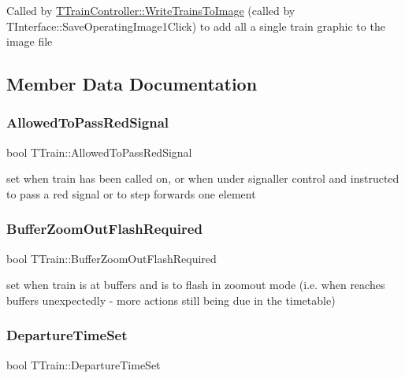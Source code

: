 Called by \mbox{\hyperlink{class_t_train_controller_aa5e441a9ec80e5076b2c05c2bb6f3fd3}{T\+Train\+Controller\+::\+Write\+Trains\+To\+Image}} (called by T\+Interface\+::\+Save\+Operating\+Image1\+Click) to add all a single train graphic to the image file 

\subsection{Member Data Documentation}
\mbox{\label{class_t_train_a8c94580b79a8ad1ad0fce51f0abba822}} 
\subsubsection{\texorpdfstring{Allowed\+To\+Pass\+Red\+Signal}{AllowedToPassRedSignal}}
{\footnotesize\ttfamily bool T\+Train\+::\+Allowed\+To\+Pass\+Red\+Signal\hspace{0.3cm}{\ttfamily [private]}}

set when train has been called on, or when under signaller control and instructed to pass a red signal or to step forwards one element \mbox{\label{class_t_train_a60a3a9bebf64411f5d200682575a69ee}} 
\subsubsection{\texorpdfstring{Buffer\+Zoom\+Out\+Flash\+Required}{BufferZoomOutFlashRequired}}
{\footnotesize\ttfamily bool T\+Train\+::\+Buffer\+Zoom\+Out\+Flash\+Required\hspace{0.3cm}{\ttfamily [private]}}

set when train is at buffers and is to flash in zoomout mode (i.\+e. when reaches buffers unexpectedly -\/ more actions still being due in the timetable) \mbox{\label{class_t_train_ab4f3876cb58a6160c2f1cd7a7eb3f234}} 
\subsubsection{\texorpdfstring{Departure\+Time\+Set}{DepartureTimeSet}}
{\footnotesize\ttfamily bool T\+Train\+::\+Departure\+Time\+Set\hspace{0.3cm}{\ttfamily [private]}}

